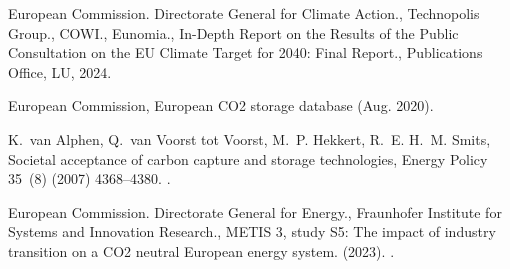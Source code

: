 \documentclass[preprint,12pt,sort&compress]{elsarticle}
\begin{document}
\begin{thebibliography}{10}
{European Commission. Directorate General for Climate Action.}, {Technopolis Group.}, {COWI.}, {Eunomia.}, In-Depth Report on the Results of the Public Consultation on the {{EU}} Climate Target for 2040: Final Report., Publications Office, LU, 2024.

{European Commission}, European {{CO2}} storage database (Aug. 2020).

K.~{van Alphen}, Q.~{van Voorst tot Voorst}, M.~P. Hekkert, R.~E. H.~M. Smits, Societal acceptance of carbon capture and storage technologies, Energy Policy 35~(8) (2007) 4368--4380.
\newblock \href {https://doi.org/10.1016/j.enpol.2007.03.006} {}.

{European Commission. Directorate General for Energy.}, {Fraunhofer Institute for Systems and Innovation Research.}, {{METIS}} 3, study {{S5}}: The impact of industry transition on a {{CO2}} neutral {{European}} energy system. (2023).
\newblock \href {https://doi.org/10.2833/094502} {}.

\end{thebibliography}
\end{document}
